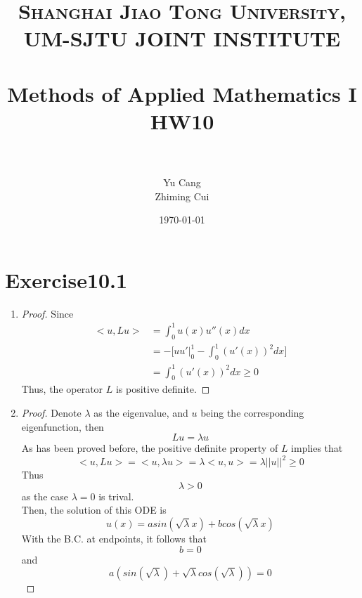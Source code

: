 \documentclass[paper=a4, fontsize=11pt]{scrartcl} %
\title{	
\normalfont \normalsize 
\textsc{Shanghai Jiao Tong University, UM-SJTU JOINT INSTITUTE} \\ [25pt] %
\horrule{0.5pt} \\[0.4cm] %
\huge Methods of Applied Mathematics I\\ HW10 \\ %
\horrule{2pt} \\[0.5cm] %
}
\author{Yu Cang \quad 018370210001\\ Zhiming Cui \quad 017370910006} %
\date{\normalsize \today} %
\numberwithin{equation}{section} %
\numberwithin{figure}{section} %
\numberwithin{table}{section} %
\begin{document}
\maketitle %

\section{Exercise10.1}
	\begin{enumerate}
		\item
			\begin{proof}
				Since
				\begin{equation}
					\begin{aligned}
						<u, Lu> & = \int_{0}^{1} u(x) u''(x) dx\\
								& = -\Big[uu'\big|_0^1 - \int_{0}^{1}(u'(x))^2 dx\Big]\\
								& =  \int_{0}^{1}(u'(x))^2 dx \geq 0
					\end{aligned}
				\end{equation}
				Thus, the operator $L$ is positive definite.
			\end{proof}
		\item 
			\begin{proof}
				Denote $\lambda$ as the eigenvalue, and $u$ being the corresponding eigenfunction, then
				\begin{equation}
					Lu = \lambda u
				\end{equation}
				As has been proved before, the positive definite property of $L$ implies that
				\begin{equation}
					<u, Lu> = <u, \lambda u> = \lambda <u, u> = \lambda ||u||^2 \geq 0
				\end{equation}
				Thus 
				\begin{equation}
					\lambda > 0
				\end{equation}
				as the case $\lambda = 0$ is trival.\\
				Then, the solution of this ODE is 
				\begin{equation}
					u(x) = a sin(\sqrt{\lambda} x) + b cos(\sqrt{\lambda} x)
				\end{equation}
				With the B.C. at endpoints, it follows that
				\begin{equation}
					b = 0
				\end{equation}
				and
				\begin{equation}
					a(sin(\sqrt{\lambda}) + \sqrt{\lambda}cos(\sqrt{\lambda})) = 0
				\end{equation}

\end{proof}
\end{enumerate}
\end{document}
